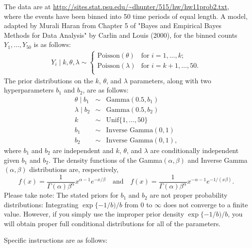 \documentclass{article}
\begin{document}
\begin{enumerate}
  The data are at 
  \url{http://sites.stat.psu.edu/~dhunter/515/hw/hw11prob2.txt},
  where the events have been binned into 50 time periods of equal length. A
  model, adapted by Murali Haran from Chapter 5 of "Bayes and Empirical Bayes
  Methods for Data Analysis" by Carlin and Louis (2000), for the binned counts
  $Y_1, \ldots, Y_{50}$ is as follows:
  \begin{eqnarray*}
  Y_i \mid k, \theta, \lambda \sim \begin{cases}
  \mbox{Poisson}(\theta) & \mbox{for $i=1, \ldots, k$;} \\
  \mbox{Poisson}(\lambda) & \mbox{for $i=k+1, \ldots, 50$.} \\
  \end{cases}
  \end{eqnarray*}
  The prior distributions on the $k$, $\theta$, and $\lambda$ parameters, along
  with two hyperparameters $b_1$ and $b_2$, are as follows:
  \begin{eqnarray*}
  \theta\mid b_1 &\sim& \mbox{Gamma}(0.5, b_1) \\
  \lambda\mid b_2 &\sim& \mbox{Gamma}(0.5, b_2) \\
  k &\sim& \mbox{Unif}\{1, \ldots, 50\} \\
  b_1 &\sim& \mbox{Inverse Gamma}(0,1) \\
  b_2 &\sim& \mbox{Inverse Gamma}(0,1),
  \end{eqnarray*}
  where $b_1$ and $b_2$ are independent and $k$, $\theta$, and $\lambda$ are
  conditionally independent given $b_1$ and $b_2$. The density functions of the
  Gamma$(\alpha, \beta)$ and Inverse Gamma$(\alpha, \beta)$ distributions are,
  respectively,
  \[
  f(x) = \frac{1}{\Gamma(\alpha)\beta^\alpha} x^{\alpha-1} e^{-x/\beta}
  \quad\mbox{and}\quad
  f(x) = \frac{1}{\Gamma(\alpha)\beta^\alpha} x^{-\alpha-1} e^{-1/(x\beta)}.
  \]
  Please take note:  The stated priors for $b_1$ and $b_2$ are not proper probability
  distributions:  Integrating $\exp\{-1/b)/b$ from 0 to $\infty$ does not converge to a finite
  value.  However, if you simply use the improper prior density $\exp\{-1/b)/b$, you will obtain
  proper full conditional distributions for all of the parameters.
  
  Specific instructions are as follows:

    \begin{enumerate}
    

\end{enumerate}
\end{enumerate}
\end{document}
